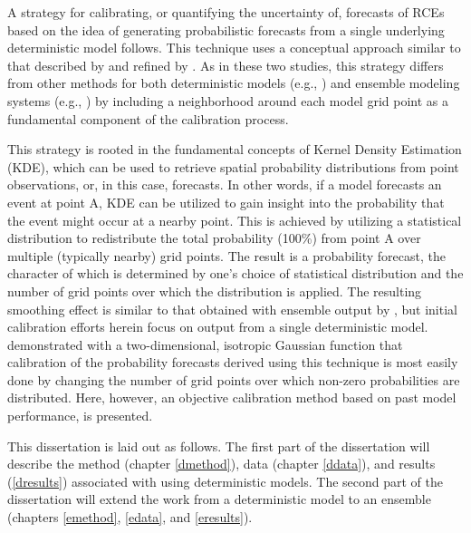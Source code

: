 A strategy for calibrating, or quantifying the uncertainty of, forecasts of RCEs based on the idea of generating probabilistic forecasts from a single underlying deterministic model follows. This technique uses a conceptual approach similar to that described by \cite{Theis2005} and refined by \cite{Sobash2011}. As in these two studies, this strategy differs from other methods for both deterministic models (e.g., \citealp{Glahn1972}) and ensemble modeling systems (e.g., \citealp{Hamill1998, Raftery2005, Clark2009, Glahn2009}) by including a neighborhood around each model grid point as a fundamental component of the calibration process.

This strategy is rooted in the fundamental concepts of Kernel Density Estimation (KDE), which can be used to retrieve spatial probability distributions from point observations, or, in this case, forecasts. In other words, if a model forecasts an event at point A, KDE can be utilized to gain insight into the probability that the event might occur at a nearby point. This is achieved by utilizing a statistical distribution to redistribute the total probability (100\%) from point A over multiple (typically nearby) grid points. The result is a probability forecast, the character of which is determined by one's choice of statistical distribution and the number of grid points over which the distribution is applied. The resulting smoothing effect is similar to that obtained with ensemble output by \cite{Wilks2002}, but initial calibration efforts herein focus on output from a single deterministic model. \cite{Sobash2011} demonstrated with a two-dimensional, isotropic Gaussian function that calibration of the probability forecasts derived using this technique is most easily done by changing the number of grid points over which non-zero probabilities are distributed. Here, however, an objective calibration method based on past model performance, is presented.

This dissertation is laid out as follows. The first part of the dissertation will describe the method (chapter \ref{dmethod}), data (chapter \ref{ddata}), and results (\ref{dresults}) associated with using deterministic models. The second part of the dissertation will extend the work from a deterministic model to an ensemble (chapters \ref{emethod}, \ref{edata}, and \ref{eresults}).


